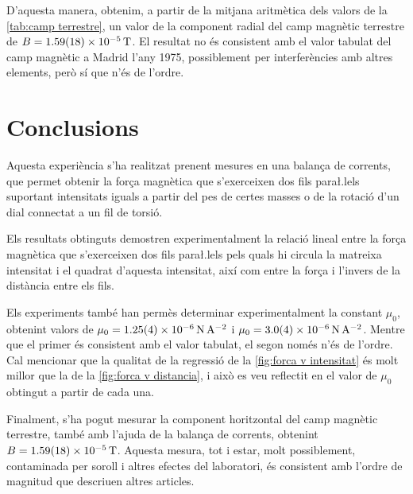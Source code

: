 D'aquesta manera, obtenim, a partir de la mitjana aritmètica dels valors de la \cref{tab:camp terrestre}, un valor de la component radial del camp magnètic terrestre de \( B = \data{1.59}{0.18d-5}{T}  \). El resultat no és consistent amb el valor tabulat del camp magnètic a Madrid l'any 1975, possiblement per interferències amb altres elements, però sí que n'és de l'ordre.

\section{Conclusions}
Aquesta experiència s'ha realitzat prenent mesures en una balança de corrents, que permet obtenir la força magnètica que s'exerceixen dos fils para\l.lels suportant intensitats iguals a partir del pes de certes masses o de la rotació d'un dial connectat a un fil de torsió.

Els resultats obtinguts demostren experimentalment la relació lineal entre la força magnètica que s'exerceixen dos fils para\l.lels pels quals hi circula la matreixa intensitat i el quadrat d'aquesta intensitat, així com entre la força i l'invers de la distància entre els fils.

Els experiments també han permès determinar experimentalment la constant $\mu_0$, obtenint valors de \( \mu_0 = \data{1.25}{0.04e-6}{N.A^{-2}} \) i \( \mu_0 = \data{3.0}{0.4d-6}{N.A^{-2}} \). Mentre que el primer és consistent amb el valor tabulat, el segon només n'és de l'ordre. Cal mencionar que la qualitat de la regressió de la \cref{fig:forca v intensitat} és molt millor que la de la \cref{fig:forca v distancia}, i això es veu reflectit en el valor de \( \mu_0 \) obtingut a partir de cada una. 

Finalment, s'ha pogut mesurar la component horitzontal del camp magnètic terrestre, també amb l'ajuda de la balança de corrents, obtenint \( B = \data{1.59}{0.18d-5}{T} \). Aquesta mesura, tot i estar, molt possiblement, contaminada per soroll i altres efectes del laboratori, és consistent amb l'ordre de magnitud que descriuen altres articles. 
